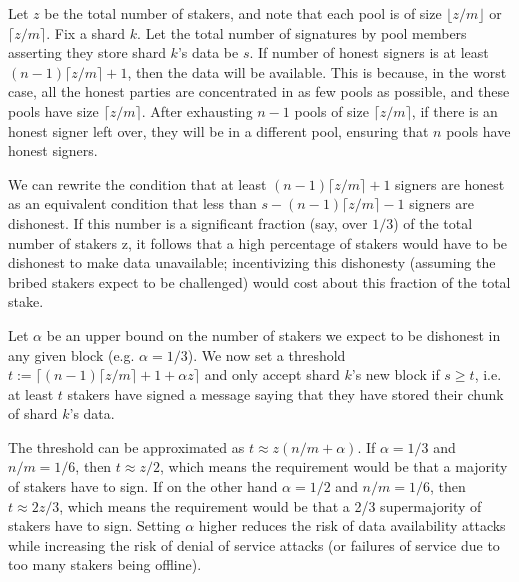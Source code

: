 \documentclass{article}
\begin{document}
Let $z$ be the total number of stakers, and note that each pool is of size $\lfloor z/m \rfloor$ or $\lceil z/m \rceil$.  Fix a shard $k$.  Let the total number of signatures by pool members asserting they store shard $k$'s data be $s$.
If number of honest signers is at least $(n-1)\lceil z/m \rceil+1$, then the data will be available.  This is because, in the worst case, all the honest parties are concentrated
in as few pools as possible, and these pools have size $\lceil z/m \rceil$.  After exhausting $n-1$ pools of size $\lceil z/m \rceil$, if there is an honest signer left over, they will
be in a different pool, ensuring that $n$ pools have honest signers.

We can rewrite the condition that at least $(n-1)\lceil z/m \rceil + 1$ signers are honest as an equivalent
condition that less than $s-(n-1)\lceil z/m \rceil - 1$ signers are dishonest. If this number is a significant fraction (say, over $1/3$) of the
total number of stakers z, it follows that a high percentage of stakers would have to
be dishonest to make data unavailable; incentivizing this dishonesty (assuming
the bribed stakers expect to be challenged) would cost about this fraction of
the total stake.

Let $\alpha$ be an upper bound on the number of stakers we expect to be dishonest in any given block (e.g. $\alpha = 1/3$).
We now set a threshold $t := \lceil (n-1)\lceil z/m \rceil + 1 + \alpha z \rceil$ and only accept shard $k$'s new block
if $s \geq t$, i.e. at least $t$ stakers have signed a message saying that they have stored their
chunk of shard $k$'s data.

The threshold can be approximated as $t \approx z(n/m + \alpha)$.  If $\alpha = 1/3$ and $n/m = 1/6$, then $t \approx z/2$,
which means the requirement would be that a majority of stakers have to sign.  If on the other hand $\alpha = 1/2$ and $n/m = 1/6$,
then $t \approx 2z/3$, which means the requirement would be that a 2/3 supermajority of stakers have to sign.
Setting $\alpha$ higher reduces the risk of data availability attacks while increasing the risk of denial of service attacks
(or failures of service due to too many stakers being offline).
\end{document}
